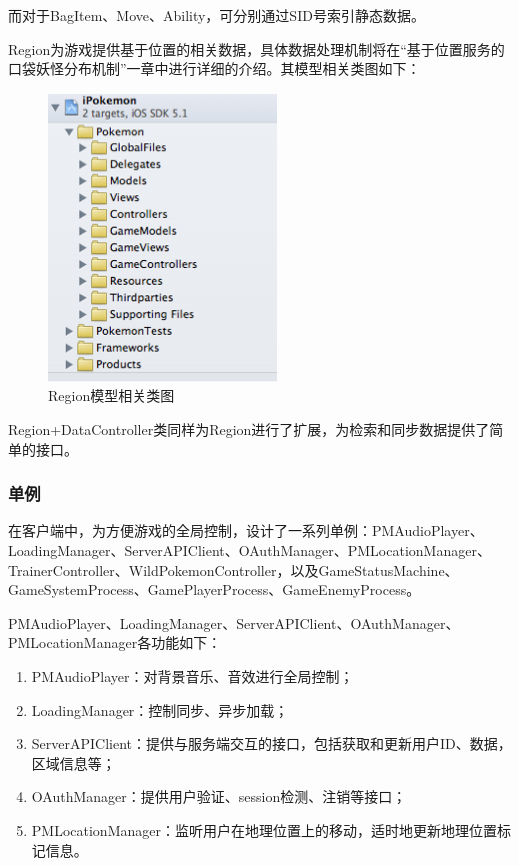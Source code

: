 \documentclass{article}
\begin{document}
\begin{CJK}{UTF8}{gbsn}
  而对于BagItem、Move、Ability，可分别通过SID号索引静态数据。

  Region为游戏提供基于位置的相关数据，具体数据处理机制将在“基于位置服务的口袋妖怪分布机制”一章中进行详细的介绍。其模型相关类图如下：

  \begin{figure}[htbp]
		\centering
		\includegraphics[bb=0 0 548 341, scale=0.45]{figure/fig_n09.png}
		\caption{Region模型相关类图}
		\label{fig:n09}
	\end{figure}

  Region+DataController类同样为Region进行了扩展，为检索和同步数据提供了简单的接口。

	\subsubsection{单例}

  在客户端中，为方便游戏的全局控制，设计了一系列单例：PMAudioPlayer、LoadingManager、ServerAPIClient、OAuthManager、PMLocationManager、TrainerController、WildPokemonController，以及GameStatusMachine、GameSystemProcess、GamePlayerProcess、GameEnemyProcess。

  PMAudioPlayer、LoadingManager、ServerAPIClient、OAuthManager、PMLocationManager各功能如下：

  \begin{enumerate}
		\item PMAudioPlayer：对背景音乐、音效进行全局控制；
		\item LoadingManager：控制同步、异步加载；
		\item ServerAPIClient：提供与服务端交互的接口，包括获取和更新用户ID、数据，区域信息等；
		\item OAuthManager：提供用户验证、session检测、注销等接口；
		\item PMLocationManager：监听用户在地理位置上的移动，适时地更新地理位置标记信息。
  \end{enumerate}


\end{CJK}
\end{document}
